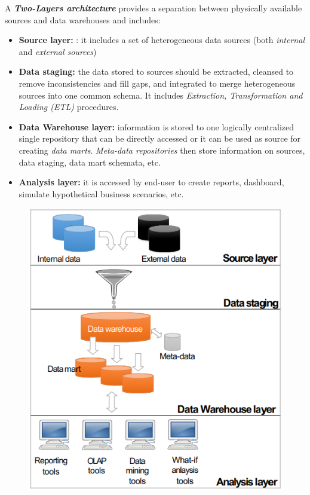 A \textbf{\textit{Two-Layers architecture}} provides a separation between physically available sources and data warehouses and includes:
\begin{itemize}
    \item \textbf{Source layer:} : it includes a set of heterogeneous data sources (both \textit{internal} and \textit{external sources})
    \item \textbf{Data staging:} the data stored to sources should be extracted, cleansed to remove inconsistencies and fill gaps, and integrated to merge heterogeneous sources into one common schema. It includes \textit{Extraction, Transformation and Loading (ETL)} procedures.
    \item \textbf{Data Warehouse layer:} information is stored to one logically centralized single repository that can be directly accessed or it can be used as source for creating \textit{data marts}. \textit{Meta-data repositories} then store information on sources, data staging, data mart schemata, etc.
    \item \textbf{Analysis layer:} it is accessed by end-user to create reports, dashboard, simulate hypothetical business scenarios, etc.
\end{itemize}

\begin{figure}[ht!]
    \centering
    \includegraphics[scale=0.55]{images/DWH_two_layers.png}
\end{figure}

